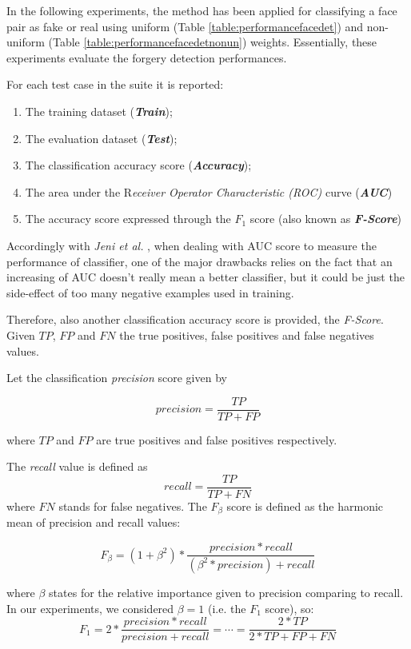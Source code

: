 In the following experiments, the  method has been applied for classifying a face pair as fake or real using uniform (Table \ref{table:performancefacedet}) and non-uniform (Table \ref{table:performancefacedetnonun}) weights. Essentially, these experiments evaluate the forgery detection performances.

For each test case in the suite it is reported:
\begin{enumerate}
\item The training dataset (\textbf{\emph{Train}});
\item The evaluation dataset (\textbf{\emph{Test}});
\item The classification accuracy score (\textbf{\emph{Accuracy}});
\item The area under the R\emph{eceiver Operator Characteristic (ROC)} curve (\textbf{\emph{AUC}})
\item The accuracy score expressed through the $F_1$ score (also known as \textbf{\emph{F-Score}})
\end{enumerate}

Accordingly with \emph{Jeni et al.} \cite{jeni2013facing}, when dealing with AUC score to measure the performance of classifier, one of the major drawbacks relies on the fact that an increasing of AUC doesn't really mean a better classifier, but it could be just the side-effect of too many negative examples used in training.

Therefore, also another classification accuracy score is provided, the \emph{F-Score}. Given $TP$, $FP$ and $FN$ the true positives, false positives and false negatives values. 

Let the classification \emph{precision} score given by

$$
precision = \frac{TP}{TP + FP}
$$

where $TP$ and $FP$ are true positives and false positives respectively.

The \emph{recall} value is defined as
$$
recall = \frac{TP}{TP + FN}
$$
where $FN$ stands for false negatives. The $F_{\beta}$ score is defined as the harmonic mean of precision and recall values:

\begin{equation}
F_{\beta} = (1 + \beta^2) * \frac{precision * recall}{(\beta^2 * precision) + recall}
\end{equation}

where $\beta$ states for the relative importance given to precision comparing to recall. In our experiments, we considered $\beta = 1$ (i.e. the $F_1$ score), so:
\begin{equation}
F_{1} = 2 * \frac{precision * recall}{precision + recall}  = \cdots = \frac{2 * TP}{2 * TP + FP + FN}
\end{equation}


